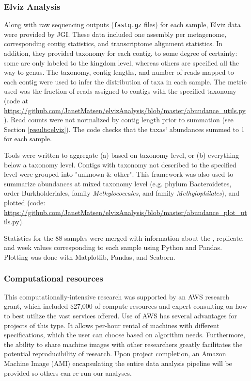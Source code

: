 \subsubsection{Elviz Analysis}  %
Along with raw sequencing outputs (\texttt{fastq.gz} files) for each sample, Elviz data \cite{cantor2015} were provided by JGI.
These data included one assembly per metagenome, corresponding contig statistics, and transcriptome alignment statistics.
In addition, they provided taxonomy for each contig, to some degree of certainty: some are only labeled to the kingdom level, whereas others are specified all the way to genus.
The taxonomy, contig lengths, and number of reads mapped to each contig were used to infer the distribution of taxa in each sample.
The metric used was the fraction of reads assigned to contigs with the specified taxonomy (code at \url{https://github.com/JanetMatsen/elvizAnalysis/blob/master/abundance_utils.py}).
Read counts were not normalized by contig length prior to summation (see Section \ref{results:elviz}).
The code checks that the taxas` abundances summed to 1 for each sample.

Tools were written to aggregate (a) based on taxonomy level, or (b) everything below a taxonomy level.
Contigs with taxonomy not described to the specified level were grouped into "unknown \& other".
This framework was also used to summarize abundances at mixed taxonomy level (e.g. phylum Bacteroidetes, order Burkholderiales, family \textit{Methylococcales}, and family \textit{Methylophilales}), and plotted (code: \url{https://github.com/JanetMatsen/elvizAnalysis/blob/master/abundance_plot_utils.py}).

Statistics for the 88 samples were merged with information about the , replicate, and week values corresponding to each sample using Python and Pandas.
Plotting was done with Matplotlib, Pandas, and Seaborn.

\subsubsection{Computational resources}   %
This computationally-intensive research was supported by an AWS research grant, which included \$27,000 of compute resources and expert consulting on how to best utilize the vast services offered.
Use of AWS has several advantages for projects of this type.
It allows per-hour rental of machines with different specifications, which the user can choose based on algorithm needs.
Furthermore, the ability to share machine images with other researchers greatly facilitates the potential reproducibility of research.
Upon project completion, an Amazon Machine Image (AMI) encapsulating the entire data analysis pipeline will be provided so others can re-run our analyses.


